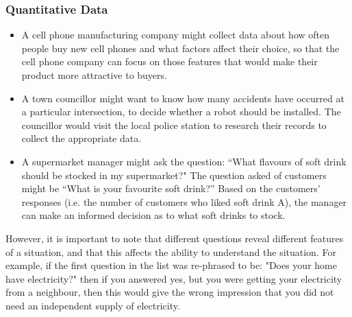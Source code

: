 \begin{description}[noitemsep]
            \subsubsection{ Quantitative Data}
            \nopagebreak
          \label{m39403*id200557}\begin{itemize}[noitemsep]
            \label{m39403*uid13}\item A cell phone manufacturing company might collect data about how often people buy new cell phones and what factors affect their choice, so that the cell phone company can focus on those features that would make their product more attractive to buyers.
\label{m39403*uid14}\item A town councillor might want to know how many accidents have occurred at a particular intersection, to decide whether a robot should be installed. The councillor would visit the local police station to research their records to collect the appropriate data.
\label{m39403*uid15}\item A supermarket manager might ask the question: ``What flavours of soft drink should be stocked in my supermarket?" The question asked of customers might be ``What is your favourite soft drink?'' Based on the customers' responses (i.e. the number of customers who liked soft drink A), the manager can make an informed decision as to what soft drinks to stock. 
\end{itemize}
          \label{m39403*id200605}However, it is important to note that different questions reveal different features of a situation, and that this affects the ability to understand
the situation. For example, if the first question in the list was re-phrased to be: "Does your home have electricity?" then if you answered yes, but you were getting your electricity from a neighbour, then this would give the wrong impression that you did not need an independent supply of electricity.\par 
      \label{m39403*uid16}

\end{description}

